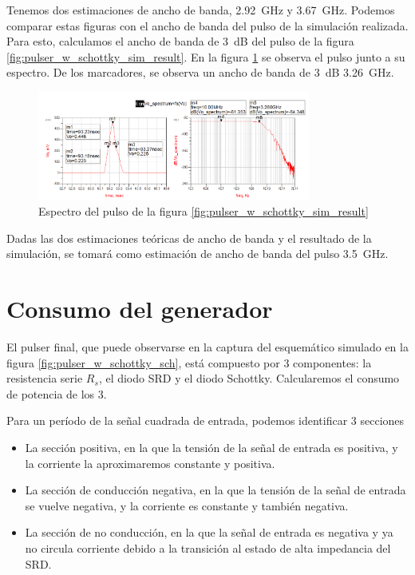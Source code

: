 Tenemos dos estimaciones de ancho de banda, \qty{2.92}{\giga\hertz} y
\qty{3.67}{\giga\hertz}. Podemos comparar estas figuras con el ancho de banda
del pulso de la simulación realizada. Para esto, calculamos el ancho de banda de
\qty{3}{\dB} del pulso de la figura \ref{fig:pulser_w_schottky_sim_result}. En
la figura \ref{fig:pulse_bandwidth_simulation} se observa el pulso junto a su
espectro. De los marcadores, se observa un ancho de banda de \qty{3}{\dB}
\qty{3.26}{\giga\hertz}.

\begin{figure}[t!]
    \centering
    \includegraphics[width=0.8\textwidth]{images/pulse_bandwidth_simulation.jpg}
    \caption{Espectro del pulso de la figura \ref{fig:pulser_w_schottky_sim_result}}
    \label{fig:pulse_bandwidth_simulation}
\end{figure}

Dadas las dos estimaciones teóricas de ancho de banda y el resultado de la
simulación, se tomará como estimación de ancho de banda del pulso
\qty{3.5}{\giga\hertz}.

\section{Consumo del generador}
\label{sec:pulser_power}

El pulser final, que puede observarse en la captura del esquemático simulado en
la figura \ref{fig:pulser_w_schottky_sch}, está compuesto por 3 componentes: la
resistencia serie $R_s$, el diodo SRD y el diodo Schottky. Calcularemos el
consumo de potencia de los 3.

Para un período de la señal cuadrada de entrada, podemos identificar 3 secciones

\begin{itemize}
    \item La sección positiva, en la que la tensión de la señal de entrada es
        positiva, y la corriente la aproximaremos constante y positiva.
    \item La sección de conducción negativa, en la que la tensión de la señal de
        entrada se vuelve negativa, y la corriente es constante y también
        negativa.
    \item La sección de no conducción, en la que la señal de entrada es
        negativa y ya no circula corriente debido a la transición al estado de
        alta impedancia del SRD.
\end{itemize}

